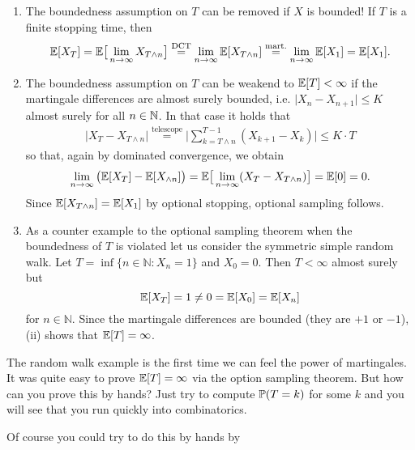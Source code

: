 \begin{remark}
	\begin{enumerate}[label=(\roman*)]
		\item
		The boundedness assumption on $T$ can be removed if $X$ is bounded! If $T$ is a finite stopping time, then $$\E[X_T] = \E\big[ \lim\limits_{n \to \infty} X_{T\wedge n}\big] \overset{\text{DCT}}{=} \lim\limits_{n \to \infty}\E[X_{T\wedge n}] \overset{\text{mart.}}{=} \lim\limits_{n \to \infty} \E[X_1] = \E[X_1].$$
		\item
		The boundedness assumption on $T$ can be weakend to $\E[T] < \infty$ if the martingale differences are almost surely bounded, i.e. $\lvert X_n - X_{n+1}\rvert \leq K$ almost surely for all $n\in\N$. In that case it holds that 
		\begin{align*}
			\lvert X_T- X_{T \wedge n}  \rvert \overset{\text{telescope}}= \Big| \sum\limits_{k=T\wedge n }^{T-1} (X_{k+1}-X_k)\Big| \leq K\cdot T
		\end{align*}
		so that, again by dominated convergence, we obtain
		$$\lim\limits_{n \to \infty}\big(\E[X_{T}]-\E[X_{\wedge n}]\big) =  \E\big[\lim\limits_{n \to \infty}(X_{T}-X_{T\wedge n})\big] = \E[0] = 0.$$ 
		Since $\E[X_{T\wedge n}]=\E[X_1] $ by optional stopping, optional sampling follows.
				\item As a counter example to the optional sampling theorem when the boundedness of $T$ is violated let us consider the symmetric simple random walk. Let $T = \inf\{n\in\mathbb{N}\colon X_n=1\}$ and $X_0=0$. Then $T<\infty$ almost surely but $$\E[X_T] = 1 \neq 0 = \E[X_0] = \E[X_n]$$ for $n\in \mathbb{N}$. Since the martingale differences are bounded (they are $+1$ or $-1$), (ii) shows that $\E[T]=\infty$.

	\end{enumerate}
\end{remark}
The random walk example is the first time we can feel the power of martingales. It was quite easy to prove $\E[T]=\infty$ via the option sampling theorem. But how can you prove this by hands? Just try to compute $\P(T=k)$ for some $k$ and you will see that you run quickly into combinatorics.


 Of course you could try to do this by hands by 

